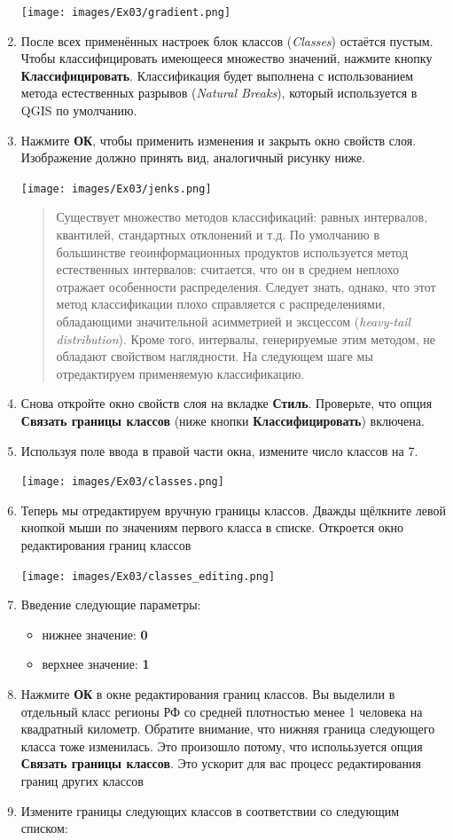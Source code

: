 \documentclass[
  12pt,
]{book}
\providecommand{\tightlist}{%
  \setlength{\itemsep}{0pt}\setlength{\parskip}{0pt}}
\begin{document}
\begin{enumerate}
  \texttt{[image: images/Ex03/gradient.png]}
\item
  После всех применённых настроек блок классов (\emph{Classes}) остаётся пустым. Чтобы классифицировать имеющееся множество значений, нажмите кнопку \textbf{Классифицировать}. Классификация будет выполнена с использованием метода естественных разрывов (\emph{Natural Breaks}), который используется в QGIS по умолчанию.
\item
  Нажмите \textbf{ОК}, чтобы применить изменения и закрыть окно свойств слоя. Изображение должно принять вид, аналогичный рисунку ниже.

  \texttt{[image: images/Ex03/jenks.png]}

  \begin{quote}
  Существует множество методов классификаций: равных интервалов, квантилей, стандартных отклонений и т.д. По умолчанию в большинстве геоинформационных продуктов используется метод естественных интервалов: считается, что он в среднем неплохо отражает особенности распределения. Следует знать, однако, что этот метод классификации плохо справляется с распределениями, обладающими значительной асимметрией и эксцессом (\emph{heavy-tail distribution}). Кроме того, интервалы, генерируемые этим методом, не обладают свойством наглядности. На следующем шаге мы отредактируем применяемую классификацию.
  \end{quote}
\item
  Снова откройте окно свойств слоя на вкладке \textbf{Стиль}. Проверьте, что опция \textbf{Связать границы классов} (ниже кнопки \textbf{Классифицировать}) включена.
\item
  Используя поле ввода в правой части окна, измените число классов на 7.

  \texttt{[image: images/Ex03/classes.png]}
\item
  Теперь мы отредактируем вручную границы классов. Дважды щёлкните левой кнопкой мыши по значениям первого класса в списке. Откроется окно редактирования границ классов

  \texttt{[image: images/Ex03/classes\_editing.png]}
\item
  Введение следующие параметры:

  \begin{itemize}
  \tightlist
  \item
    нижнее значение: \textbf{0}
  \item
    верхнее значение: \textbf{1}
  \end{itemize}
\item
  Нажмите \textbf{ОК} в окне редактирования границ классов. Вы выделили в отдельный класс регионы РФ со средней плотностью менее 1 человека на квадратный километр. Обратите внимание, что нижняя граница следующего класса тоже изменилась. Это произошло потому, что исполььзуется опция \textbf{Связать границы классов}. Это ускорит для вас процесс редактирования границ других классов
\item
  Измените границы следующих классов в соответствии со следующим списком:


\end{enumerate}
\end{document}
